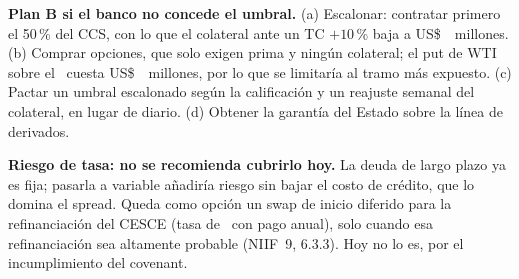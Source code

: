 \medskip\noindent
\begin{minipage}[t]{0.42\linewidth}\footnotesize\setlength{\tabcolsep}{2.5pt}\end{minipage}\hfill
\begin{minipage}[t]{0.55\linewidth}\footnotesize\setlength{\tabcolsep}{2.5pt}\end{minipage}
\medskip

\textbf{Plan B si el banco no concede el umbral.} (a) Escalonar: contratar primero el 50\,\% del CCS, con lo que el
colateral ante un TC $+10$\,\% baja a US\$~\ColateralTCMitad\ millones. (b) Comprar opciones, que solo exigen prima y
ningún colateral; el put de WTI sobre el \CoberturaCrudoPct\ cuesta US\$~\CostoPutTotal\ millones, por lo que se
limitaría al tramo más expuesto. (c) Pactar un umbral escalonado según la calificación y un reajuste semanal del
colateral, en lugar de diario. (d) Obtener la garantía del Estado sobre la línea de derivados.

\textbf{Riesgo de tasa: no se recomienda cubrirlo hoy.} La deuda de largo plazo ya es fija; pasarla a variable añadiría riesgo sin
bajar el costo de crédito, que lo domina el spread. Queda como opción un swap de inicio diferido para la
refinanciación del CESCE (tasa de \FwdSwapRate\ con pago anual), solo cuando esa refinanciación sea altamente probable
(NIIF~9, 6.3.3). Hoy no lo es, por el incumplimiento del covenant.

